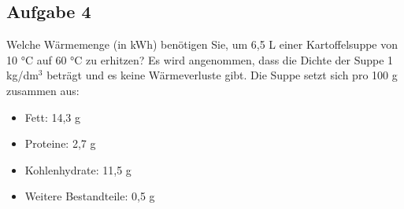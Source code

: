 \documentclass[a4paper,11pt]{article}
\newif\ifshowme
\begin{document}
\begin{enumerate}[label=\alph*)]
\ifshowme
\begin{marginfigure}[0cm]
\else
\begin{marginfigure}[-4cm]
\fi

\centering
{}
\caption{Der Wärmestrom ist an jeder Stelle der Wand konstant ($\dot{Q_1} = \dot{Q_2}$). Die Differenz der Temperatur $\Delta T$ lässt sich in ihre Bestandteile $T_1$, $T_2$ und $T_3$ zerlegen.}
\end{marginfigure}

\ifshowme
\antwort{
\begin{align*}
\dot{Q} &= - \lambda \cdot A \cdot \frac{T_3 - T_2}{d} \\
T_2 &= \frac{\dot{Q} \cdot d}{\lambda \cdot A } + T_3 \\
\\
T_2 &= \frac{4.650 ~\text{W} \cdot 0,03~\text{m}}{0,093 ~\text{W/mk} \cdot 4~\text{m}^2} + 20~^{\circ}\text{C} \\
 &= 395~^{\circ}\text{C}
\end{align*}
}

\else
\fi

\end{enumerate}


\subsection*{Aufgabe 4}
Welche Wärmemenge (in kWh) benötigen Sie, um 6,5 L einer Kartoffelsuppe von 10 °C auf
60 °C zu erhitzen? Es wird angenommen, dass die Dichte der Suppe 1 kg/dm$^3$ beträgt und
es keine Wärmeverluste gibt. \pp 
Die Suppe setzt sich pro 100 g zusammen aus: \par 
\begin{itemize}
\item Fett: 14,3 g
\item Proteine: 2,7 g
\item Kohlenhydrate: 11,5 g
\item Weitere Bestandteile: 0,5 g
\end{itemize}
\end{document}
